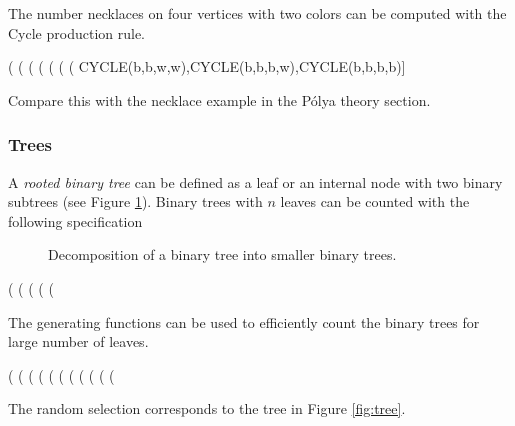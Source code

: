\documentclass[11pt]{article}
\newcommand{\DEF}[1]{{\em #1}}
\begin{document}
The number necklaces on four vertices with two colors can be computed
with the Cycle production rule.

\begin{example}
(%
(%
(%
(%
(%
(%
(%
       CYCLE(b,b,w,w),CYCLE(b,b,b,w),CYCLE(b,b,b,b)]
\end{example}
%
Compare this with the necklace example in the P\'olya theory section.

\subsubsection{Trees}

A \DEF{rooted binary tree} can be defined as a leaf or an internal
node with two binary subtrees (see Figure \ref{fig:btdef}). Binary
trees with $n$ leaves can be counted with the following specification

\begin{figure}
\begin{center}
\end{center}
\caption{Decomposition of a binary tree into smaller binary trees.}
\label{fig:btdef}
\end{figure}

\begin{example}
(%
(%
(%
(%
(%
\end{example}
%
The generating functions can be used to efficiently count
the binary trees for large number of leaves.

\begin{example}
(%
(%
(%
(%
(%
(%
(%
(%
(%
(%
(%
\end{example}
%
The random selection corresponds to the tree in Figure \ref{fig:tree}.
\end{document}
